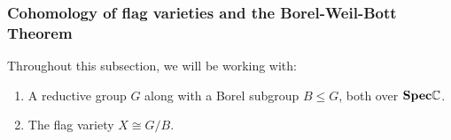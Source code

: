             \subsubsection{Cohomology of flag varieties and the Borel-Weil-Bott Theorem}
                \begin{convention}
                    Throughout this subsection, we will be working with:
                        \begin{enumerate}
                            \item A reductive group $G$ along with a Borel subgroup $B \leq G$, both over $\mathbf{Spec} \mathbb{C}$.
                            \item The flag variety $X \cong G/B$.
                        \end{enumerate}
                \end{convention} 